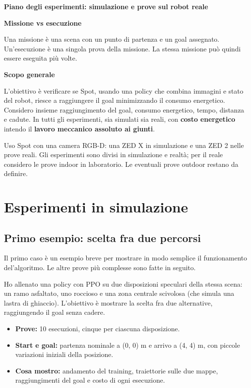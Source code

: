 \documentclass[11pt,a4paper]{article}
\begin{document}
\begin{center}
{\Large\bfseries Piano degli esperimenti: simulazione e prove sul robot reale}
\end{center}

\textbf{Missione vs esecuzione}

Una missione è una scena con un punto di partenza e un goal assegnato. Un'esecuzione è una singola prova della missione. La stessa missione può quindi essere eseguita più volte.

\textbf{Scopo generale}

L'obiettivo è verificare se Spot, usando una policy che combina immagini e stato del robot, riesce a raggiungere il goal minimizzando il consumo energetico. Considero insieme raggiungimento del goal, consumo energetico, tempo, distanza e cadute. In tutti gli esperimenti, sia simulati sia reali, con \textbf{costo energetico} intendo il \textbf{lavoro meccanico assoluto ai giunti}.

Uso Spot con una camera RGB-D: una ZED X in simulazione e una ZED 2 nelle prove reali. Gli esperimenti sono divisi in simulazione e realtà; per il reale considero le prove indoor in laboratorio. Le eventuali prove outdoor restano da definire.

\section{Esperimenti in simulazione}

\subsection{Primo esempio: scelta fra due percorsi}

Il primo caso è un esempio breve per mostrare in modo semplice il funzionamento del'algoritmo.
Le altre prove più complesse sono fatte in seguito.

Ho allenato una policy con PPO su due disposizioni speculari della stessa scena: un ramo asfaltato, uno roccioso e una zona centrale scivolosa (che simula una lastra di ghiaccio).
L'obiettivo è mostrare la scelta fra due alternative, raggiungendo il goal senza cadere.

\begin{itemize}
\item \textbf{Prove:} 10 esecuzioni, cinque per ciascuna disposizione.
\item \textbf{Start e goal:} partenza nominale a (0, 0) m e arrivo a (4, 4) m, con piccole variazioni iniziali della posizione.
\item \textbf{Cosa mostro:} andamento del training, traiettorie sulle due mappe, raggiungimenti del goal e costo di ogni esecuzione.

\end{itemize}
\end{document}
